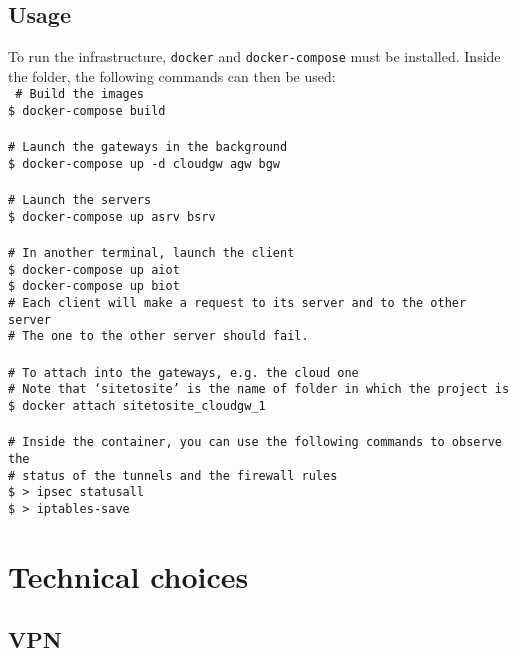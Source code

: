 \documentclass[paper=a4, fontsize=11pt]{scrartcl}
\begin{document}
\subsection{Usage}

To run the infrastructure, \texttt{docker} and \texttt{docker-compose} must be
installed.
Inside the folder, the following commands can then be used:\\
\texttt{%
    \# Build the images \\
    \$ docker-compose build
    \\ \\
    \# Launch the gateways in the background \\
    \$ docker-compose up -d cloudgw agw bgw
    \\ \\
    \# Launch the servers \\
    \$ docker-compose up asrv bsrv
    \\ \\
    \# In another terminal, launch the client \\
    \$ docker-compose up aiot \\
    \$ docker-compose up biot \\
    \# Each client will make a request to its server and to the other server \\
    \# The one to the other server should fail.
    \\ \\
    \# To attach into the gateways, e.g.\ the cloud one \\
    \# Note that `sitetosite' is the name of folder in which the project is \\
    \$ docker attach sitetosite\_cloudgw\_1
    \\ \\
    \# Inside the container, you can use the following commands to observe the \\
    \# status of the tunnels and the firewall rules \\
    \$ > ipsec statusall \\
    \$ > iptables-save
}

\section{Technical choices}

\subsection{VPN}
\end{document}
